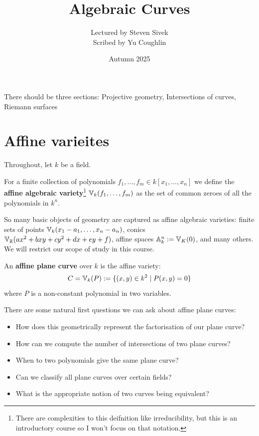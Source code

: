 \documentclass{article}
\begin{document}
\title{Algebraic Curves}
\author{Lectured by Steven Sivek \\
Scribed by Yu Coughlin}
\date{Autumn 2025}

\maketitle

There should be three sections: Projective geometry, Intersections of curves, Riemann surfaces

\tableofcontents

\section{Affine varieites}

Throughout, let $k$ be a field.

\begin{definition}
    For a finite collection of polynomials $f_1,\ldots,f_m\in k[x_1,\ldots,x_n]$ we define the \textbf{affine algebraic variety}\footnote{There are complexities to this deifnition like irreducibility, but this is an introductory course so I won't focus on that notation.} $\mathbb{V}_k(f_1,\ldots,f_m)$ as the set of common zeroes of all the polynomials in $k^n$.
\end{definition}

So many basic objects of geometry are captured as affine algebraic varieties: finite sets of points $\mathbb{V}_k(x_1-a_1,\ldots,x_n-a_n)$, conics $\mathbb{V}_{\mathbb{R}}(ax^2+bxy+cy^2+dx+ey+f)$, affine spaces $\mathbb{A}_k^n := \mathbb{V}_K(0)$, and many others. We will restrict our scope of study in this course.

\begin{definition}
    An \textbf{affine plane curve} over $k$ is the affine variety: \[
        C = \mathbb{V}_k(P) := \{(x,y)\in k^2 \mid P(x,y) = 0\}
    \] where $P$ is a non-constant polynomial in two variables.
\end{definition}

There are some natural first questions we can ask about affine plane curves: 
\begin{itemize}
    \item How does this geometrically represent the factorisation of our plane curve?
    \item How can we compute the number of intersections of two plane curves?
    \item When to two polynomials give the same plane curve?
    \item Can we classify all plane curves over certain fields?
    \item What is the appropriate notion of two curves being equivalent?
\end{itemize}
\end{document}
